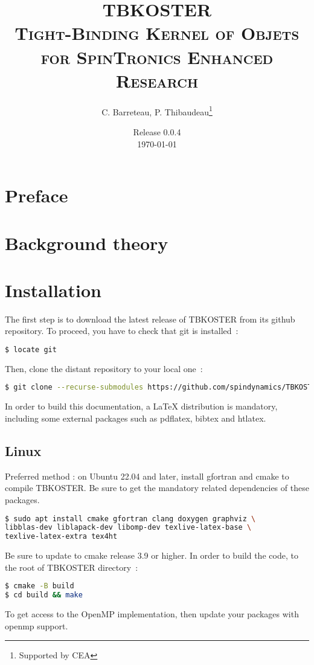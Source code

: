 \documentclass[12pt, onecolumn]{memoir}
\title{{\textbf{\huge\textcolor{nicered}{TBKOSTER}}} \\ \textsc{\small Tight-Binding Kernel of Objets for SpinTronics Enhanced Research}}
\author{C. Barreteau, P. Thibaudeau\thanks{Supported by CEA}}
\date{Release 0.0.4\\ \today}
\begin{document}
\frontmatter
\maketitle
\begin{abstract}
\end{abstract}
\tableofcontents*
\chapter*{Preface}
\mainmatter
\chapter{Background theory}
\chapter{Installation}
The first step is to download the latest release of TBKOSTER from its github repository. To proceed, you have to check that git is installed~:
\begin{lstlisting}[language=bash,basicstyle=\small]
$ locate git
\end{lstlisting}
Then, clone the distant repository to your local one~:
\begin{lstlisting}[language=bash,basicstyle=\small]
$ git clone --recurse-submodules https://github.com/spindynamics/TBKOSTER.git
\end{lstlisting}
In order to build this documentation, a LaTeX distribution is mandatory, including some external packages such as pdflatex, bibtex and htlatex.
\section{Linux}
Preferred method : on Ubuntu 22.04 and later, install gfortran and cmake to compile TBKOSTER. Be sure to get the mandatory related dependencies of these packages.
\begin{lstlisting}[language=sh,basicstyle=\small]
$ sudo apt install cmake gfortran clang doxygen graphviz \
libblas-dev liblapack-dev libomp-dev texlive-latex-base \
texlive-latex-extra tex4ht
\end{lstlisting}
Be sure to update to cmake release 3.9 or higher.
In order to build the code, to the root of TBKOSTER directory~:
\begin{lstlisting}[language=sh,basicstyle=\small]
$ cmake -B build
$ cd build && make
\end{lstlisting}
To get access to the OpenMP implementation, then update your packages with openmp support.
\end{document}
